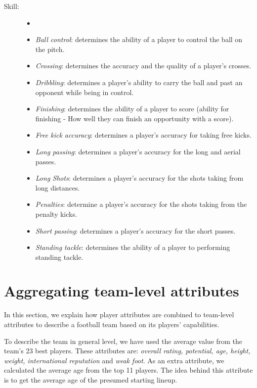 \begin{description}
\begin{itemize}
    \end{itemize}
    \item[Skill:]
    \begin{itemize}
        \itemsep0.3em
        \item[]
        \item{\textit{Ball control}:} determines the ability of a player to control the ball on the pitch.
        \item{\textit{Crossing}:} determines the accuracy and the quality of a player's crosses.
        \item{\textit{Dribbling}:} determines a player's ability to carry the ball and past an opponent while being in control.
        \item{\textit{Finishing}:} determines the ability of a player to score (ability for finishing - How well they can finish an opportunity with a score).
        \item{\textit{Free kick accuracy}:} determines a player's accuracy for taking free kicks.
        \item{\textit{Long passing}:} determines a player's accuracy for the long and aerial passes.
        \item{\textit{Long Shots}:} determines a player's accuracy for the shots taking from long distances.
        \item{\textit{Penalties}:} determine a player's accuracy for the shots taking from the penalty kicks.
        \item{\textit{Short passing}:} determines a player's accuracy for the short passes.
        \item{\textit{Standing tackle}:} determines the ability of a player to performing standing tackle.

    \end{itemize}

\end{description}

\section{Aggregating team-level attributes}
In this section, we explain how player attributes are combined to team-level attributes to describe a football team based on its players' capabilities.

To describe the team in general level, we have used the average value from the team's 23 best players. These attributes are: \textit{overall rating, potential, age, height, weight, international reputation} and \textit{weak foot}. As an extra attribute, we calculated the average age from the top 11 players. The idea behind this attribute is to get the average age of the presumed starting lineup.

